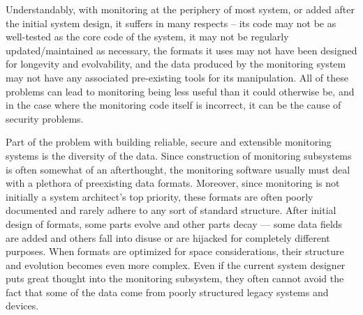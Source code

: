 \documentclass[11pt]{article}
\begin{document}

Understandably, with monitoring at the periphery of most system, or
added after the initial system design, it suffers in many respects --
its code may not be as well-tested as the core code of the system, it
may not be regularly updated/maintained as necessary, the formats it
uses may not have been designed for longevity and evolvability, and
the data produced by the monitoring system may not have any associated
pre-existing tools for its manipulation. All of these problems can
lead to monitoring being less useful than it could otherwise be, and
in the case where the monitoring code itself is incorrect, it can be
the cause of security problems.

Part of the problem with building reliable, secure and extensible
monitoring systems is the diversity
of the data.  Since construction of monitoring subsystems is often
somewhat of an afterthought, the monitoring software usually
must deal with a plethora of preexisting data formats.  
Moreover, since monitoring is not initially a system architect's
top priority, these formats are often poorly documented and
rarely adhere to any sort of standard structure.  After
initial design of formats, some parts evolve and other parts decay
--- some data fields are added and others fall into disuse or
are hijacked for completely different purposes.  When formats are
optimized for space considerations, their structure and evolution
becomes even more complex.  
Even if the current system designer puts great thought 
into the monitoring subsystem, they often cannot avoid the fact that
some of the data come from poorly structured legacy systems and devices.


\end{document}
